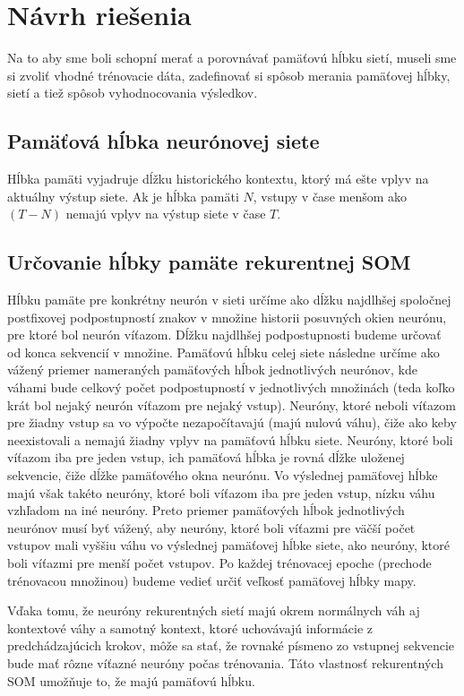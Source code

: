 \chapter{Návrh riešenia}
Na to aby sme boli schopní merať a porovnávať pamäťovú hĺbku sietí, museli sme si
zvoliť vhodné trénovacie dáta, zadefinovať si spôsob merania pamäťovej hĺbky,
sietí a tiež spôsob vyhodnocovania výsledkov.

\section{Pamäťová hĺbka neurónovej siete}
Hĺbka pamäti vyjadruje dĺžku historického kontextu, ktorý má ešte vplyv na aktuálny výstup siete.
Ak je hĺbka pamäti $N$, vstupy v čase menšom ako $(T - N)$ nemajú vplyv na výstup siete v čase $T$.

\section{Určovanie hĺbky pamäte rekurentnej SOM}
Hĺbku pamäte pre konkrétny neurón v sieti určíme ako dĺžku najdlhšej spoločnej postfixovej
podpostupností znakov v množine historii posuvných okien neurónu, pre ktoré bol neurón víťazom.
Dĺžku najdlhšej podpostupnosti budeme určovať od konca sekvencií v množine.
Pamäťovú hĺbku celej siete následne určíme ako vážený priemer nameraných pamäťových hĺbok jednotlivých neurónov, 
kde váhami bude celkový počet podpostupností v jednotlivých množinách (teda koľko krát bol nejaký neurón víťazom pre nejaký vstup).
Neuróny, ktoré neboli víťazom pre žiadny vstup sa vo výpočte nezapočítavajú (majú nulovú váhu), čiže ako keby neexistovali a nemajú žiadny vplyv na pamäťovú hĺbku siete.
Neuróny, ktoré boli víťazom iba pre jeden vstup, ich pamäťová hĺbka je rovná dĺžke uloženej sekvencie, čiže dĺžke pamäťového okna neurónu.
Vo výslednej pamäťovej hĺbke majú však takéto neuróny, ktoré boli víťazom iba pre jeden vstup, nízku váhu vzhľadom na iné neuróny.
Preto priemer pamäťových hĺbok jednotlivých neurónov musí byť vážený, aby neuróny, 
ktoré boli víťazmi pre väčší počet vstupov mali vyššiu váhu vo výslednej pamäťovej hĺbke siete, ako neuróny, ktoré boli víťazmi pre menší počet vstupov.
Po každej trénovacej epoche (prechode trénovacou množinou) budeme vedieť určiť veľkosť pamäťovej hĺbky mapy.

Vďaka tomu, že neuróny rekurentných sietí majú okrem normálnych váh aj kontextové váhy a samotný kontext, 
ktoré uchovávajú informácie z predchádzajúcich krokov, môže sa stať, že rovnaké písmeno zo vstupnej sekvencie 
bude mať rôzne víťazné neuróny počas trénovania. Táto vlastnosť rekurentných SOM umožňuje to, že majú pamäťovú hĺbku.

